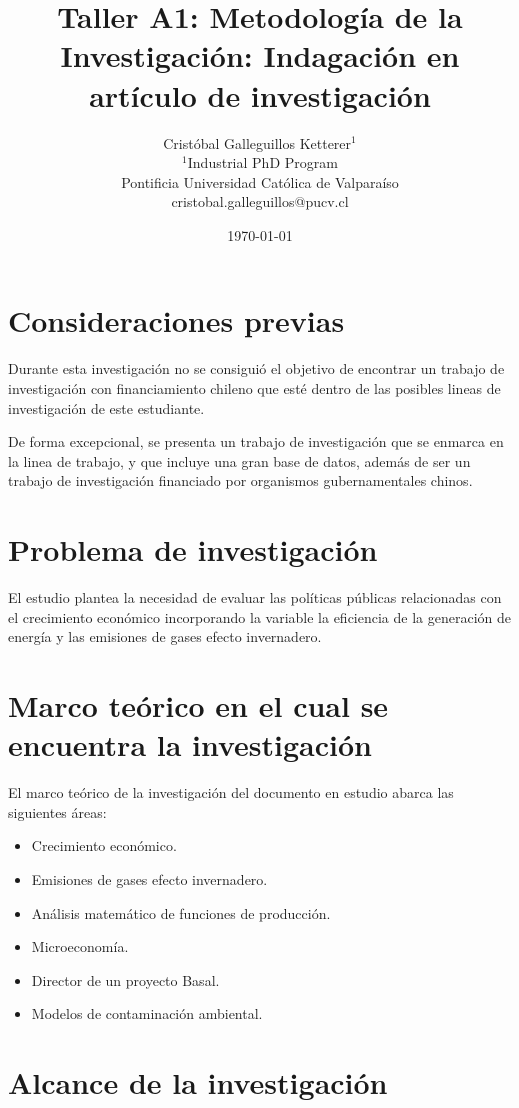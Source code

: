 \documentclass{article}
\title{Taller A1: Metodología de la Investigación: Indagación en artículo de investigación}
\author{Cristóbal Galleguillos Ketterer$^{1}$\\
\small{$^{1}$Industrial PhD Program}\\
\small{Pontificia Universidad Católica de Valparaíso}\\
\small{cristobal.galleguillos@pucv.cl}
}
\date{\small{\today}}
\begin{document}
\maketitle

\section{Consideraciones previas}

Durante esta investigación no se consiguió el objetivo de encontrar un trabajo de investigación con financiamiento chileno que esté dentro de las posibles lineas de investigación de este estudiante.

De forma excepcional, se presenta un trabajo de investigación que se enmarca en la linea de trabajo, y que incluye una gran base de datos, además de ser un trabajo de investigación financiado por organismos gubernamentales chinos.

\section{Problema de investigación}

El estudio plantea la necesidad de evaluar las políticas públicas relacionadas con el crecimiento económico incorporando la variable la eficiencia de la generación de energía y las emisiones de gases efecto invernadero.

\section{Marco teórico en el cual se encuentra la investigación}

El marco teórico de la investigación del documento en estudio abarca las siguientes áreas:

\begin{itemize}
    \item Crecimiento económico.
    \item Emisiones de gases efecto invernadero.
    \item Análisis matemático de funciones de producción.
    \item Microeconomía.
    \item Director de un proyecto Basal.
    \item Modelos de contaminación ambiental.
\end{itemize}

\section{Alcance de la investigación}
\end{document}
